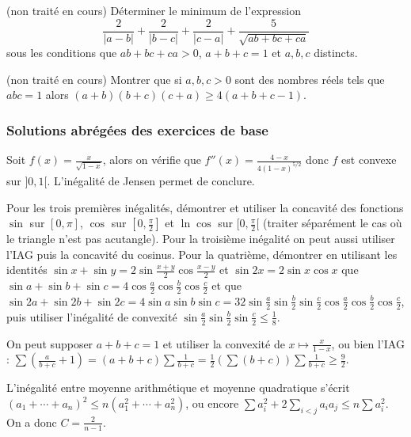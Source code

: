 \begin{exo} (non trait\'e en cours)
 D\'eterminer le minimum de l'expression
$$\frac{2}{|a-b|}+\frac{2}{|b-c|}+\frac{2}{|c-a|}+\frac{5}{\sqrt{ab+bc+ca}}$$
sous les conditions que $ab+bc+ca>0$, $a+b+c=1$ et $a,b,c$ distincts.
\end{exo}

\begin{exo}  (non trait\'e en cours)
 Montrer que si $a,b,c> 0$ sont des nombres r\'eels tels que $abc=1$ alors $(a+b)(b+c)(c+a)\geqslant 4(a+b+c-1)$.
\end{exo}


\subsubsection{Solutions abr\'eg\'ees des exercices de base}

\begin{sol}
 Soit $f(x)=\frac{x}{\sqrt{1-x}}$, alors on v\'erifie que $f''(x)=\frac{4-x}{4(1-x)^{5/2}}$ donc $f$ est convexe sur $]0,1[$. L'in\'egalit\'e de Jensen permet de conclure.
\end{sol}

\begin{sol}
Pour les trois premi\`eres in\'egalit\'es, d\'emontrer et utiliser la concavit\'e des fonctions $\sin$ sur $[0,\pi]$, $\cos$ sur $[0,\frac{\pi}{2}]$ et $\ln\cos$ sur $[0,\frac{\pi}{2}[$ (traiter s\'epar\'ement le cas o\`u le triangle n'est pas acutangle). Pour la troisi\`eme in\'egalit\'e on peut aussi utiliser l'IAG puis la concavit\'e du cosinus. Pour la quatri\`eme, d\'emontrer en utilisant les identit\'es $\sin x+\sin y=2\sin\frac{x+y}{2}\cos\frac{x-y}{2}$ et $\sin 2x=2\sin x\cos x$ que $\sin a+\sin b+\sin c=4\cos\frac{a}{2}\cos\frac{b}{2}\cos\frac{c}{2}$ et que $\sin 2a+\sin 2b+\sin 2c=4\sin a\sin b\sin c=32 \sin\frac{a}{2}\sin\frac{b}{2}\sin\frac{c}{2}\cos\frac{a}{2}\cos\frac{b}{2}\cos\frac{c}{2}$, puis utiliser l'in\'egalit\'e de convexit\'e $\sin\frac{a}{2}\sin\frac{b}{2}\sin\frac{c}{2}\leqslant\frac{1}{8}$.
\end{sol}

\begin{sol}
 On peut supposer $a+b+c=1$ et utiliser la convexit\'e de $x\mapsto \frac{x}{1-x}$, ou bien l'IAG :
$\sum(\frac{a}{b+c}+1)=(a+b+c)\sum\frac{1}{b+c}=\frac{1}{2}(\sum (b+c))\sum\frac{1}{b+c}\geqslant \frac{9}{2}$.
\end{sol}

\begin{sol}
L'in\'egalit\'e entre moyenne arithm\'etique et moyenne quadratique s'\'ecrit $(a_1+\cdots+a_n)^2\leqslant n (a_1^2+\cdots+a_n^2)$,
ou encore $\sum a_i^2+2\sum_{i<j}a_ia_j \leqslant n\sum a_i^2$. On a donc $C=\frac{2}{n-1}$.
\end{sol}

